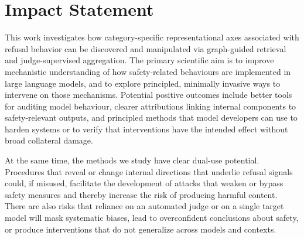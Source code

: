 \documentclass{article}
\theoremstyle{plain}
\theoremstyle{definition}
\theoremstyle{remark}
\begin{document}





\section*{Impact Statement}

This work investigates how category-specific representational axes associated with refusal behavior can be discovered and manipulated via graph-guided retrieval and judge-supervised aggregation. The primary scientific aim is to improve mechanistic understanding of how safety-related behaviours are implemented in large language models, and to explore principled, minimally invasive ways to intervene on those mechanisms. Potential positive outcomes include better tools for auditing model behaviour, clearer attributions linking internal components to safety-relevant outputs, and principled methods that model developers can use to harden systems or to verify that interventions have the intended effect without broad collateral damage.

At the same time, the methods we study have clear dual-use potential. Procedures that reveal or change internal directions that underlie refusal signals could, if misused, facilitate the development of attacks that weaken or bypass safety measures and thereby increase the risk of producing harmful content. There are also risks that reliance on an automated judge or on a single target model will mask systematic biases, lead to overconfident conclusions about safety, or produce interventions that do not generalize across models and contexts.
\end{document}

